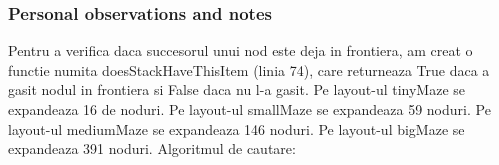\subsubsection{Personal observations and notes}
Pentru a verifica daca succesorul unui nod este deja in frontiera,
am creat o functie numita doesStackHaveThisItem (linia 74), care returneaza True daca a gasit nodul in frontiera si False daca nu l-a gasit.\newline
Pe layout-ul tinyMaze se expandeaza 16 de noduri. \newline
Pe layout-ul smallMaze se expandeaza 59 noduri. \newline
Pe layout-ul mediumMaze se expandeaza 146 noduri. \newline
Pe layout-ul bigMaze se expandeaza 391 noduri. \newline \newline
Algoritmul de cautare: 
